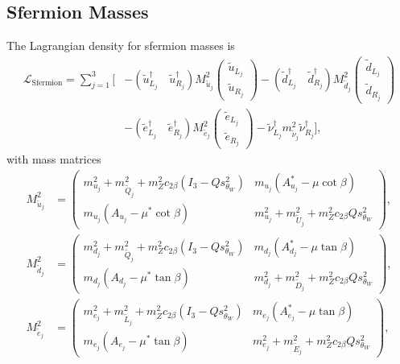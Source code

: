 \documentclass[a4paper,12pt]{book}
\begin{document}
\subsection{Sfermion Masses}
The Lagrangian density for sfermion masses is 
\begin{align}
\nonumber
\mathcal{L}_\text{Sfermion} = \sum_{j=1}^3 \biggl[& \left. -\left(\tilde{u}_{L_j}^\dagger \quad \tilde{u}_{R_j}^\dagger\right) M^2_{\tilde{u}_j} \begin{pmatrix}
\tilde{u}_{L_j}\\
\tilde{u}_{R_j}
\end{pmatrix} 
-\left(\tilde{d}_{L_j}^\dagger \quad \tilde{d}_{R_j}^\dagger\right) M^2_{\tilde{d}_j} \begin{pmatrix}
\tilde{d}_{L_j}\\
\tilde{d}_{R_j}
\end{pmatrix}\right.\\
 &-\left(\tilde{e}_{L_j}^\dagger \quad \tilde{e}_{R_j}^\dagger\right) M^2_{\tilde{e}_j} \begin{pmatrix}
\tilde{e}_{L_j}\\
\tilde{e}_{R_j}
\end{pmatrix} - \tilde{\nu}_{L_j}^\dagger m^2_{\tilde{\nu}_j} \tilde{\nu}_{R_j}^\dagger \biggr],
\end{align}
with mass matrices 
\begin{align}
M^2_{\tilde{u}_j} &= \begin{pmatrix}
m_{u_j}^2 + m^2_{\tilde{Q}_j}+m_Z^2 c_{2\beta} \left(I_3-Q s_{\theta_W}^2\right)& m_{u_j} \left(A_{u_j}^*-\mu \cot \beta\right)\\
m_{u_j} \left(A_{u_j}-\mu^* \cot \beta\right)& m_{u_j}^2 + m^2_{\tilde{U}_j}+m_Z^2 c_{2\beta} Q s_{\theta_W}^2
\end{pmatrix},\\
M^2_{\tilde{d}_j} &= \begin{pmatrix}
m_{d_j}^2 + m^2_{\tilde{Q}_j}+m_Z^2 c_{2\beta} \left(I_3-Q s_{\theta_W}^2\right)& m_{d_j} \left(A_{d_j}^*-\mu \tan \beta\right)\\
m_{d_j} \left(A_{d_j}-\mu^* \tan \beta\right)& m_{d_j}^2 + m^2_{\tilde{D}_j}+m_Z^2 c_{2\beta} Q s_{\theta_W}^2
\end{pmatrix},\\
M^2_{\tilde{e}_j} &= \begin{pmatrix}
m_{e_j}^2 + m^2_{\tilde{L}_j}+m_Z^2 c_{2\beta} \left(I_3-Q s_{\theta_W}^2\right)& m_{e_j} \left(A_{e_j}^*-\mu \tan \beta\right)\\
m_{e_j} \left(A_{e_j}-\mu^* \tan \beta\right)& m_{e_j}^2 + m^2_{\tilde{E}_j}+m_Z^2 c_{2\beta} Q s_{\theta_W}^2
\end{pmatrix},
\end{align}
\end{document}
